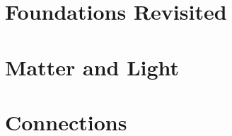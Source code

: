\documentclass[12pt]{book}
\begin{document}
\part{Foundations Revisited}\label{part:foundations-revisited}





\part{Matter and Light}








\part{Connections}











\appendix
\renewcommand{\thechapter}{}
\renewcommand{\chaptername}{Appendix}
\renewcommand{\thesection}{\arabic{section}}


\backmatter


\small
\printindex
\end{document}
